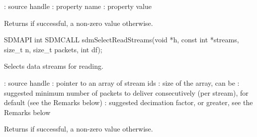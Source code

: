 \documentclass[a4paper,12pt,twoside,extrafontsizes]{memoir}
\begin{document}
\begin{funcparams}
	: source handle
	: property name
	: property value
\end{funcparams}

\begin{funcret}
	Returns  if successful, a non-zero value otherwise.
\end{funcret}



\begin{cfuncprototype}
SDMAPI int SDMCALL sdmSelectReadStreams(void *h, const int *streams, size_t n, size_t packets, int df);
\end{cfuncprototype}

\begin{funcdescr}
	Selects data streams for reading.
\end{funcdescr}

\begin{funcparams}
	: source handle
	: pointer to an array of stream ids
	: size of the array, can be 
	: suggested minimum number of packets to deliver consecutively (per stream),  for default (see the Remarks below)
	: suggested decimation factor,  or greater, see the Remarks below
\end{funcparams}

\begin{funcret}
	Returns  if successful, a non-zero value otherwise.
\end{funcret}
\end{document}

